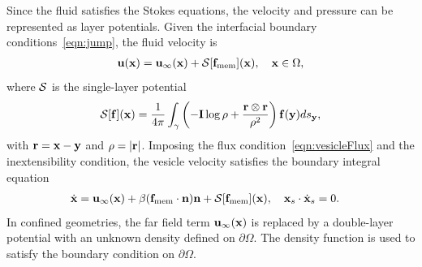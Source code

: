 \documentclass[prb,preprint,showpacs,preprintnumbers,amsmath,amssymb,longbibliography]{revtex4-1}
\begin{document}
Since the fluid satisfies the Stokes equations, the velocity and
pressure can be represented as layer potentials. Given the interfacial
boundary conditions~\eqref{eqn:jump}, the fluid velocity is
\begin{align}
  \mathbf{u}(\mathbf{x}) = \mathbf{u}_\infty(\mathbf{x}) + \mathcal{S}[\mathbf{f}_\mathrm{mem}](\mathbf{x}), \quad
    \mathbf{x} \in \Omega,
\end{align}
where $\mathcal{S}$ is the single-layer potential
\begin{align}
  \mathcal{S}[\mathbf{f}](\mathbf{x}) = \frac{1}{4\pi} \int_{\gamma} \left(
    -\mathbf{I} \log\rho + \frac{\mathbf{r} \otimes \mathbf{r}}{\rho^2} \right)
    \mathbf{f}(\mathbf{y}) ds_{\mathbf{y}},
\end{align}
with $\mathbf{r} = \mathbf{x} - \mathbf{y}$ and $\rho = |\mathbf{r}|$. Imposing the flux
condition~\eqref{eqn:vesicleFlux} and the inextensibility condition, the
vesicle velocity satisfies the boundary integral equation
\begin{align}
  \label{eqn:vesVelocity}
  \dot{\mathbf{x}} &= \mathbf{u}_\infty(\mathbf{x}) + \beta (\mathbf{f}_\mathrm{mem}\cdot\mathbf{n})\mathbf{n}
  + \mathcal{S} [\mathbf{f}_\mathrm{mem}](\mathbf{x}),  \quad
  \mathbf{x}_s \cdot \dot{\mathbf{x}}_s = 0.
\end{align}
In confined geometries, the far field term $\mathbf{u}_\infty(\mathbf{x})$ is replaced
by a double-layer potential with an unknown density defined on
$\partial\Omega$. The density function is used to satisfy the boundary
condition on $\partial\Omega$.
\end{document}
